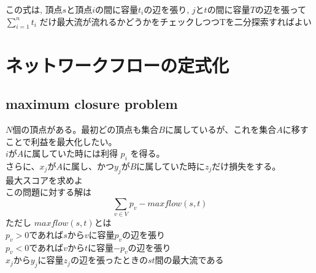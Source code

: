 \documentclass[13pt, a4paper, landscape]{jarticle}
\theoremstyle{nonitalic} %
\begin{document}
この式は, 頂点$s$と頂点$i$の間に容量$t_i$の辺を張り, $j$と$t$の間に容量$T$の辺を張って$\sum_{i=1}^n t_i $ だけ最大流が流れるかどうかをチェックしつつTを二分探索すればよい



\section{ネットワークフローの定式化}
\subsection{maximum closure problem}
$N$個の頂点がある。最初どの頂点も集合$B$に属しているが、これを集合$A$に移すことで利益を最大化したい。 \\
$i$が$A$に属していた時には利得 $p_i$ を得る。 \\
さらに、$x_j$が$A$に属し、かつ$y_j$が$B$に属していた時に$z_j$だけ損失をする。 \\
最大スコアを求めよ \\


この問題に対する解は
\[ \sum_{v \in V } p_v - maxflow(s,t) \]
ただし $maxflow(s,t) $とは\\
$p_v>0$であれば$s$から$v$に容量$p_v$の辺を張り\\
$p_v<0$であれば$v$から$t$に容量$-p_v$の辺を張り \\
$x_j$から$y_j$に容量$z_j$の辺を張ったときの$st$間の最大流である  
\end{document}
